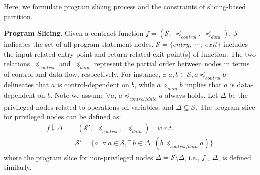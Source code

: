 Here, we formulate program slicing process and the constraints of slicing-based partition.

\begin{definition}{\textbf{Program Slicing}.}
Given a contract function $f = (\mathcal{S},\; \preceq_{control},\; \preceq_{data})$, $\mathcal{S}$ indicates the set of all program statement nodes. $\mathcal{S} = \{entry,\; \cdots,\; exit\}$ includes the input-related entry point and return-related exit point(s) of function. The two relations $\preceq_{control}$ and $\preceq_{data}$ represent the partial order between nodes in terms of control and data flow, respectively. For instance, $\exists\; a, b \in \mathcal{S}, a \preceq_{control} b$ delineates that $a$ is control-dependent on $b$, while $a \preceq_{data} b$ implies that $a$ is data-dependent on $b$.
Note we assume $\forall a$, $a \preceq_{control/data} a$ always holds.
Let $\Delta$ be the privileged nodes related to operations on \secrete variables, and $\Delta \subseteq \mathcal{S}$.
The program slice for privileged nodes can be defined as:
\begin{align}
    f\downharpoonright \Delta &= (\mathcal{S}',\; \preceq_{control},\; \preceq_{data}) \quad w.r.t. \nonumber\\
    &\quad \mathcal{S}'= \{a \;| \forall\,  a \in \mathcal{S}, \exists\, b \in \Delta\;  
     \; (b \preceq_{control/data} a) \} \nonumber
\end{align}
where the program slice for non-privileged nodes $\overline{\Delta} = \mathcal{S}\setminus\Delta$, i.e., $f\downharpoonright \overline{\Delta}$, is defined similarly.
\end{definition}



